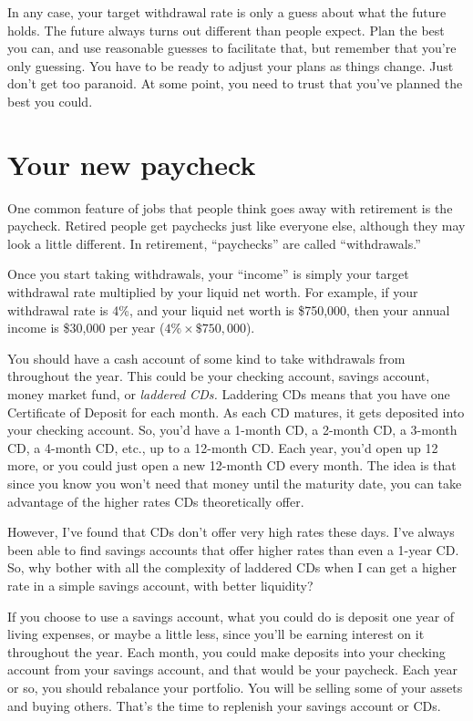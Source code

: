 In any case, your target withdrawal rate is only a guess about what the future holds. The future always turns out different than people expect. Plan the best you can, and use reasonable guesses to facilitate that, but remember that you're only guessing. You have to be ready to adjust your plans as things change. Just don't get too paranoid. At some point, you need to trust that you've planned the best you could.

\section{Your new paycheck}
One common feature of jobs that people think goes away with retirement is the paycheck. Retired people get paychecks just like everyone else, although they may look a little different. In retirement, ``paychecks'' are called ``withdrawals.''

Once you start taking withdrawals, your ``income'' is simply your target withdrawal rate multiplied by your liquid net worth. For example, if your withdrawal rate is 4\%, and your liquid net worth is \$750,000, then your annual income is \$30,000 per year ($4\% \times \$750,000$).

You should have a cash account of some kind to take withdrawals from throughout the year. This could be your checking account, savings account, money market fund, or \emph{laddered CDs.} Laddering CDs means that you have one Certificate of Deposit for each month. As each CD matures, it gets deposited into your checking account. So, you'd have a 1-month CD, a 2-month CD, a 3-month CD, a 4-month CD, etc., up to a 12-month CD. Each year, you'd open up 12 more, or you could just open a new 12-month CD every month. The idea is that since you know you won't need that money until the maturity date, you can take advantage of the higher rates CDs theoretically offer.

However, I've found that CDs don't offer very high rates these days. I've always been able to find savings accounts that offer higher rates than even a 1-year CD. So, why bother with all the complexity of laddered CDs when I can get a higher rate in a simple savings account, with better liquidity?

If you choose to use a savings account, what you could do is deposit one year of living expenses, or maybe a little less, since you'll be earning interest on it throughout the year. Each month, you could make deposits into your checking account from your savings account, and that would be your paycheck. Each year or so, you should rebalance your portfolio. You will be selling some of your assets and buying others. That's the time to replenish your savings account or CDs.

